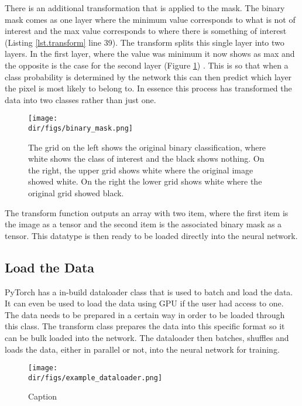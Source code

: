 There is an additional transformation that is applied to the mask. The binary mask comes as one layer where the minimum value corresponds to what is not of interest and the max value corresponds to where there is something of interest (Listing \ref{lst.transform} line 39). The transform splits this single layer into two layers. In the first layer, where the value was minimum it now shows as max and the opposite is the case for the second layer (Figure \ref{fig.binary_mask}) . This is so that when a class probability is determined by the network this can then predict which layer the pixel is most likely to belong to. In essence this process has transformed the data into two classes rather than just one.
\begin{figure}[H]
    \centering
    \texttt{[image: \\dir/figs/binary\_mask.png]}
    \caption[Binary Mask]{The grid on the left shows the original binary classification, where white shows the class of interest and the black shows nothing. On the right, the upper grid shows white where the original image showed white. On the right the lower grid shows white where the original grid showed black.}
    \label{fig.binary_mask}
\end{figure}
The transform function outputs an array with two item, where the first item is the image as a tensor and the second item is the associated binary mask as a tensor. This datatype is then ready to be loaded directly into the neural network.
\subsection{Load the Data}
PyTorch has a in-build dataloader class that is used to batch and load the data. It can even be used to load the data using GPU if the user had access to one. The data needs to be prepared in a certain way in order to be loaded through this class. The transform class prepares the data into this specific format so it can be bulk loaded into the network. The dataloader then batches, shuffles and loads the data, either in parallel or not, into the neural network for training. 
\begin{figure}
    \centering
    \texttt{[image: \\dir/figs/example\_dataloader.png]}
    \caption{Caption}
    \label{fig:my_label}
\end{figure}
